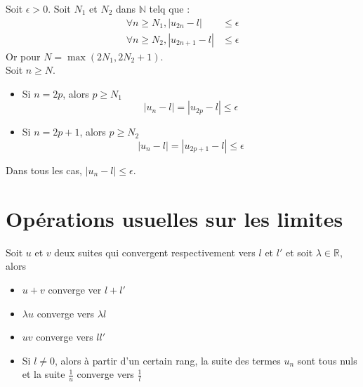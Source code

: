 \documentclass[../main.tex]{subfiles}
\begin{document}
Soit $\epsilon > 0$. Soit $N_1$ et $N_2$ dans $\mathbb{N}$ telq que : 
\begin{align*}
    \forall n \geq N_1, |u_{2n} - l| &\leq \epsilon \\
    \forall n \geq N_2, |u_{2n+1} - l| &\leq \epsilon
\end{align*}
Or pour $N = \max(2N_1, 2N_2 + 1)$. \\
Soit $n \geq N$. \\
\begin{itemize}
    \item Si $n = 2p$, alors $p \geq N_1$
    $$|u_n - l| = |u_{2p} - l| \leq \epsilon$$

    \item Si $n = 2p+1$, alors $p \geq N_2$
    $$|u_n - l| = |u_{2p+1} - l| \leq \epsilon$$
\end{itemize}
Dans tous les cas, $\boxed{|u_n - l| \leq \epsilon}$. 

\setcounter{section}{33}
\section{Opérations usuelles sur les limites}
\begin{tcolorbox}[title=Théorème 14.34, title filled=false, colframe=orange, colback=orange!10!white]
    Soit $u$ et $v$ deux suites qui convergent respectivement vers $l$ et $l'$ et soit $\lambda \in \mathbb{R}$, alors
    \begin{itemize}
        \item $u + v$ converge ver $l + l'$
        \item $\lambda u$ converge vers $\lambda l$
        \item $uv$ converge vers $ll'$
        \item Si $l \neq 0$, alors à partir d'un certain rang, la suite des termes $u_n$ sont tous nuls et la suite $\frac{1}{u}$ converge vers $\frac{1}{l}$
    \end{itemize}
\end{tcolorbox}
\end{document}
